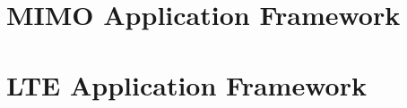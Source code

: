 
\section{MIMO Application Framework}\label{sec:MIMOAFW}
\section{LTE Application Framework}\label{sec:LTEAFW}




